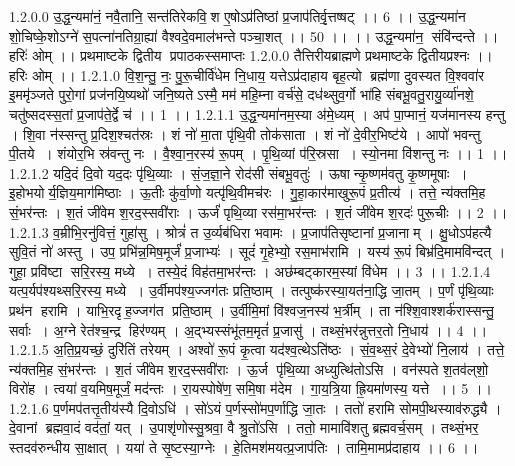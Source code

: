 1.2.0.0
उ॒द्ध॒न्यमा॑नं॒ नवै॒तानि॒ सन्त॑तिरेकवि॒॒श ए॒षोऽप्र॑तिष्ठां प्र॒जाप॑तिर्वृ॒त्तष्षट् ।। 6 ।। उ॒द्ध॒न्यमा॑न शो॒चिष्के॒शोऽग्ने॑ स॒पत्ना॑नतिग्रा॒ह्या॑ वैश्वदे॒वमाल॑भन्ते पञ्चा॒शत् ।। 50 ।। ।। उद्ध॒न्यमा॑न॒॒ संवि॑न्दन्ते ।। हरिः॑ ओम् ।। प्रथमाष्टके द्वितीय प्रपाठकस्समाप्तः
1.2.0.0
तैत्तिरीयब्राह्मणे प्रथमाष्टके द्वितीयप्रश्नः ।। हरिः ओम् ।।
1.2.1.0
वि॒श॒न्तु॒ नः॒ पु॒रू॒चीर्वि॑धेम नि॒धाय॒ यत्तेऽप्र॑दाहाय बृह॒त्यो ब्रह्म॑णा दुवस्यत वि॒श्ववा॑र इ॒ममृ॑ञ्जते पुरो॒गां प्रज॑नयि॒ष्यथो॑ जनि॒ष्यतेऽस्मै॒ मम॑ महि॒म्ना वर्च॑से॒ दध॑थ्सुव॒र्गो भा॑हि संबभू॒वतु॒रायु॒र्व्या॑नशे॒ चतु॑ष्सदस्स॒तां प्र॒जाप॑ते॒र्द्वे च॑ ।। 1 ।।
1.2.1.1
उ॒द्ध॒न्यमा॑नम॒स्या अ॑मे॒ध्यम् । अप॑ पा॒प्मानं॒ यज॑मानस्य हन्तु । शि॒वा न॑स्सन्तु प्र॒दिश॒श्चत॑स्रः । शं नो॑ मा॒ता पृ॑थि॒वी तोक॑साता । शं नो॑ दे॒वीर॒भिष्ट॑ये । आपो॑ भवन्तु पी॒तये । शंयोर॒भि स्र॑वन्तु नः । वै॒श्वा॒न॒रस्य॑ रू॒पम् । पृ॒थि॒व्यां प॑रि॒स्रसा । स्यो॒नमा वि॑शन्तु नः ।। 1 ।।
1.2.1.2
यदि॒दं दि॒वो यद॒दः पृ॑थि॒व्याः । सं॒ज॒ज्ञा॒ने रोद॑सी संबभू॒वतुः॑ । ऊषान्कृ॒ष्णम॑वतु कृ॒ष्णमूषाः । इ॒होभयोर्य॒ज्ञिय॒माग॑मिष्ठाः । ऊ॒तीः कु॑र्वा॒णो यत्पृ॑थि॒वीमच॑रः । गु॒हा॒कार॑माखुरू॒पं प्र॒तीत्य॑ । तत्ते॒ न्य॑क्तमि॒ह सं॒भर॑न्तः । श॒तं जी॑वेम श॒रद॒स्सवी॑राः । ऊर्जं॑ पृथि॒व्या रस॑मा॒भर॑न्तः । श॒तं जी॑वेम श॒रदः॑ पुरू॒चीः ।। 2 ।।
1.2.1.3
व॒म्रीभि॒रनु॑वित्तं॒ गुहा॑सु । श्रोत्रं॑ त उ॒र्व्यब॑धिरा भवामः । प्र॒जाप॑तिसृष्टानां प्र॒जानाम् । क्षु॒धोऽप॑हत्यै सुवि॒तं नो॑ अस्तु । उप॒ प्रभि॑न्न॒मिष॒मूर्जं॑ प्र॒जाभ्यः॑ । सूदं॑ गृ॒हेभ्यो॒ रस॒माभ॑रामि । यस्य॑ रू॒पं बिभ्र॑दि॒मामवि॑न्दत् । गुहा॒ प्रवि॑ष्टा सरि॒रस्य॒ मध्ये । तस्ये॒दं विह॑तमा॒भर॑न्तः । अछ॑म्बट्कारम॒स्यां वि॑धेम ।। 3 ।।
1.2.1.4
यत्प॒र्यप॑श्यथ्सरि॒रस्य॒ मध्ये । उ॒र्वीमप॑श्य॒ज्जग॑तः प्रति॒ष्ठाम् । तत्पुष्क॑रस्या॒यत॑ना॒द्धि जा॒तम् । प॒र्णं पृ॑थि॒व्याः प्रथ॑न हरामि । याभि॒रदृ॑ह॒ज्जग॑त प्रति॒ष्ठाम् । उ॒र्वीमि॒मां वि॑श्वज॒नस्य॑ भ॒र्त्रीम् । ता न॑श्शि॒वाश्शर्क॑रास्सन्तु॒ सर्वाः । अ॒ग्ने रेत॑श्च॒न्द्र हिर॑ण्यम् । अ॒द्भ्यस्संभू॑तम॒मृतं॑ प्र॒जासु॑ । तथ्सं॒भर॑न्नुत्तर॒तो नि॒धाय॑ ।। 4 ।।
1.2.1.5
अ॒ति॒प्र॒यच्छं॒ दुरि॑तिं तरेयम् । अश्वो॑ रू॒पं कृ॒त्वा यद॑श्व॒त्थेऽति॑ष्ठः । सं॒व॒थ्स॒रं दे॒वेभ्यो॑ नि॒लाय॑ । तत्ते॒ न्य॑क्तमि॒ह सं॒भर॑न्तः । श॒तं जी॑वेम श॒रद॒स्सवी॑राः । ऊ॒र्ज पृ॑थि॒व्या अध्युत्थि॑तोऽसि । वन॑स्पते श॒तव॑ल्‌शो॒ विरो॑ह । त्वया॑ व॒यमिष॒मूर्जं॒ मद॑न्तः । रा॒यस्पोषे॑ण॒ समि॒षा म॑देम । गा॒य॒त्रि॒या ह्रि॒यमा॑णस्य॒ यत्ते ।। 5 ।।
1.2.1.6
प॒र्णमप॑तत्तृ॒तीय॑स्यै दि॒वोऽधि॑ । सो॑ऽयं प॒र्णस्सो॑मप॒र्णाद्धि जा॒तः । ततो॑ हरामि सोमपी॒थस्याव॑रुद्ध्यै । दे॒वानां ब्रह्मवा॒दं वद॑तां॒ यत् । उ॒पाशृ॑णोस्सु॒श्रवा॒ वै श्रु॒तो॑ऽसि । ततो॒ मामावि॑शतु ब्रह्मवर्च॒सम् । तथ्सं॒भर॒॒ स्तदव॑रुन्धीय सा॒क्षात् । यया॑ ते सृ॒ष्टस्या॒ग्नेः । हे॒तिमश॑मयत्प्र॒जाप॑तिः । तामि॒मामप्र॑दाहाय ।। 6 ।।
